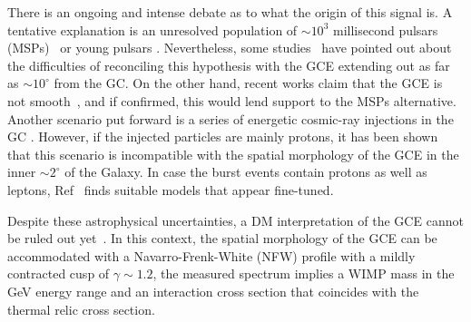 There is an ongoing and intense debate as to what the origin of this signal is. A tentative explanation is an unresolved population of $\sim 10^3$ millisecond pulsars (MSPs)~\cite{Abazajian:2010zy,AbazajianKaplinghat2012,Wharton2012,GordonMacias2013,GordonMacias2013erratum,Mirabal2013,MaciasGordon2014,YuanZhang2014,BrandtKocsis2015,Lacroix:2015wfx,O'Leary:2016osi} or young pulsars \cite{OLeary2015,O'Leary:2016osi}.
 Nevertheless, some studies~\cite{Hooper2013,CholisHooperLinden2015,PetrovicSerpicoZaharijas2015,Lee2015,BartelsKrishnamurthyWeniger2015,Linden2015} have pointed out about the difficulties of reconciling this hypothesis with the GCE extending out as far as $\sim 10^\circ$ from the GC. On the other hand, recent works claim that the GCE is not smooth~\cite{Lee:2015fea,Bartels:2015aea}, and if confirmed, this would lend support to the MSPs alternative.
 Another scenario put forward is a series of energetic cosmic-ray injections in the GC \cite{CarlsonProfumo,Petrovic2014}.
 However, if the injected particles are mainly protons, it has been shown~\cite{MacGorCroProf2015} that this scenario is incompatible with the spatial morphology of the GCE in the inner $\sim 2^\circ$ of the Galaxy.
 In case the burst events contain protons as well as leptons, Ref~\cite{Cholis2015} finds suitable models that appear fine-tuned.

Despite these astrophysical uncertainties, a DM interpretation of the GCE cannot be ruled out yet~\cite{Goodenough2009gk,Hooper:2010mq,hooper,AbazajianKaplinghat2012,AbazajianKaplinghat2013,GordonMacias2013,MaciasGordon2014,Abazajian2014,Daylan:2014,Lacroix:2015wfx}.
   In this context, the spatial morphology of the GCE can be accommodated with a Navarro-Frenk-White (NFW) profile with a mildly contracted cusp of $\gamma\sim 1.2$, the measured spectrum implies a WIMP mass in the GeV energy range and an interaction cross section that coincides with the thermal relic cross section. 

